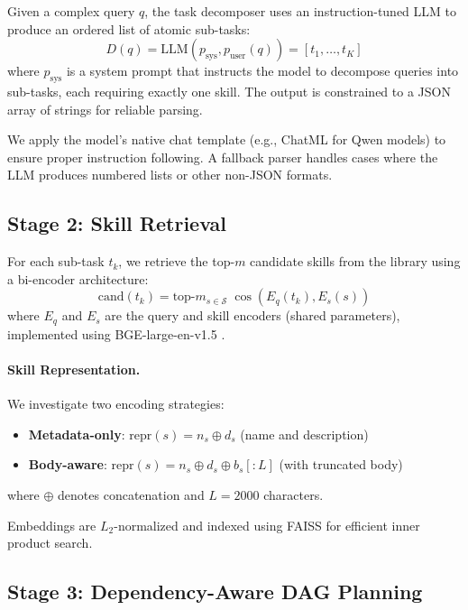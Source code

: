 \documentclass[11pt]{article}
\begin{document}
Given a complex query $q$, the task decomposer uses an instruction-tuned LLM to produce an ordered list of atomic sub-tasks:
\begin{equation}
D(q) = \text{LLM}(p_{\text{sys}}, p_{\text{user}}(q)) = [t_1, \ldots, t_K]
\end{equation}
where $p_{\text{sys}}$ is a system prompt that instructs the model to decompose queries into sub-tasks, each requiring exactly one skill.
The output is constrained to a JSON array of strings for reliable parsing.

We apply the model's native chat template (e.g., ChatML for Qwen models) to ensure proper instruction following.
A fallback parser handles cases where the LLM produces numbered lists or other non-JSON formats.

\subsection{Stage 2: Skill Retrieval}

For each sub-task $t_k$, we retrieve the top-$m$ candidate skills from the library using a bi-encoder architecture:
\begin{equation}
\text{cand}(t_k) = \text{top-}m_{s \in \mathcal{S}} \; \cos(E_q(t_k), E_s(s))
\end{equation}
where $E_q$ and $E_s$ are the query and skill encoders (shared parameters), implemented using BGE-large-en-v1.5 \cite{xiao2023bge}.

\paragraph{Skill Representation.}
We investigate two encoding strategies:
\begin{itemize}[nosep,leftmargin=*]
  \item \textbf{Metadata-only}: $\text{repr}(s) = n_s \oplus d_s$ (name and description)
  \item \textbf{Body-aware}: $\text{repr}(s) = n_s \oplus d_s \oplus b_s[:L]$ (with truncated body)
\end{itemize}
where $\oplus$ denotes concatenation and $L=2000$ characters.

Embeddings are $L_2$-normalized and indexed using FAISS \cite{johnson2019faiss} for efficient inner product search.

\subsection{Stage 3: Dependency-Aware DAG Planning}
\label{sec:compose}
\end{document}
